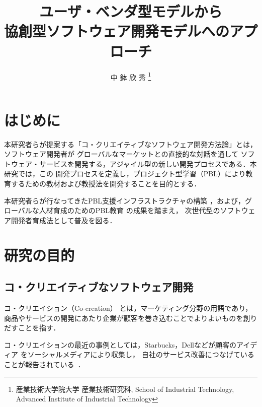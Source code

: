 \documentclass[a4j,9pt,twocolumn,twoside]{jsarticle}
\title{ユーザ・ベンダ型モデルから\\協創型ソフトウェア開発モデルへのアプローチ}
\author{
中 鉢 欣 秀
\thanks{産業技術大学院大学 産業技術研究科, School of Industrial Technology, Advanced Institute of Industrial Technology}
}
\begin{document}
\pagestyle{empty}
\maketitle\thispagestyle{empty} %
\makereceivedon %

\section{はじめに}

	本研究者らが提案する「コ・クリエイティブなソフトウェア開発方法論」とは，ソフトウェア開発者が
	グローバルなマーケットとの直接的な対話を通して
	ソフトウェア・サービスを開発する，アジャイル型の新しい開発プロセスである．本研究では，この
	開発プロセスを定義し，プロジェクト型学習（PBL）により教育するための教材および教授法を開発することを目的とする．

	本研究者らが行なってきたPBL支援インフラストラクチャの構築
	\cite{pub:chubachi-ipbl-2012}\cite{pub:chubachi-ipbl-2011}%
	\cite{pub:chubachi-ipbl-2009b}\cite{pub:chubachi-ipbl-2009a}%
	，および，グローバルな人材育成のためのPBL教育
	\cite{pub:chubachi-global-2010}\cite{pub:nishino-2010}%
	の成果を踏まえ，
	次世代型のソフトウェア開発者育成法として普及を図る．
	
	
\section{研究の目的}\label{sec:purpose}
\subsection{コ・クリエイティブなソフトウェア開発}

    コ・クリエイション（Co-creation）
    とは，マーケティング分野の用語であり，
    商品やサービスの開発にあたり企業が顧客を巻き込むことでよりよいものを創りだすことを指す．
    
    コ・クリエイションの最近の事例としては，Starbucks，Dellなどが顧客のアイディア
    をソーシャルメディアにより収集し，
    自社のサービス改善につなげていることが報告されている~\cite{wired}．
\end{document}

